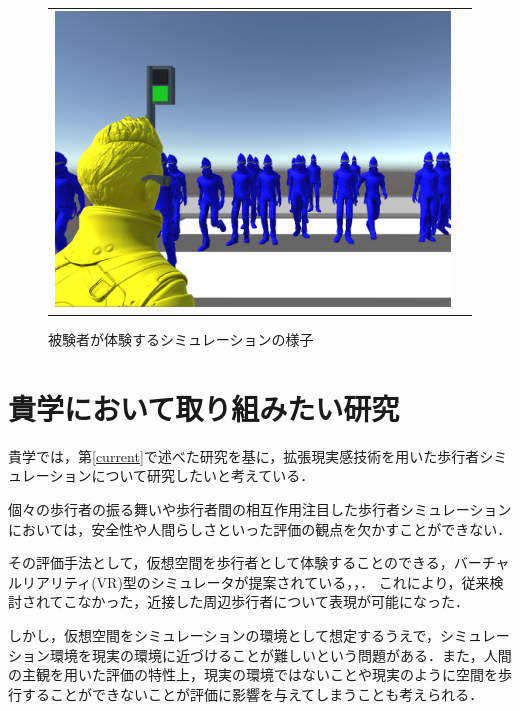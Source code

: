 \documentclass[twocolumn]{jarticle}%
\begin{document}
\begin{figure}[H]
\begin{tabular}{cc}
\begin{minipage}[t]{0.45\hsize}
        \includegraphics[keepaspectratio, scale=0.1]{images/user_view_mini.JPG}
        \caption{被験者が体験するシミュレーションの様子}
        \label{fig:user_view}
      \end{minipage}
    \end{tabular}
  \end{figure}

\vspace{-2mm}
\section{貴学において取り組みたい研究}\label{want}
貴学では，第\ref{current}で述べた研究を基に，拡張現実感技術を用いた歩行者シミュレーションについて研究したいと考えている．

個々の歩行者の振る舞いや歩行者間の相互作用注目した歩行者シミュレーションにおいては，安全性や人間らしさといった評価の観点を欠かすことができない．

その評価手法として，仮想空間を歩行者として体験することのできる，バーチャルリアリティ(VR)型のシミュレータが提案されている\cite{Iryo-VRE}，\cite{Iryo-Appli}，\cite{Iryo-VRMicroPM}．
これにより，従来検討されてこなかった，近接した周辺歩行者について表現が可能になった．

しかし，仮想空間をシミュレーションの環境として想定するうえで，シミュレーション環境を現実の環境に近づけることが難しいという問題がある．また，人間の主観を用いた評価の特性上，現実の環境ではないことや現実のように空間を歩行することができないことが評価に影響を与えてしまうことも考えられる．
\end{document}
